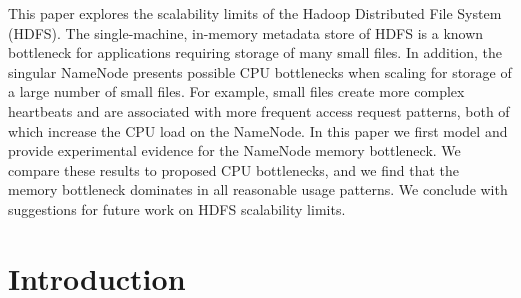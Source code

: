 \documentclass[11pt, a4paper]{article}
\author{\theauthor}
\title{\thetitle}
\date{\duedate}
\renewenvironment{abstract}
 {\small
  \begin{center}
  \bfseries \abstractname\vspace{-.5em}\vspace{0pt}
  \end{center}
  \list{}{%
    \setlength{\leftmargin}{0mm}%
    \setlength{\rightmargin}{\leftmargin}%
  }%
  \item\relax}
 {\endlist}
\begin{document}
\maketitle
\thispagestyle{empty}
\begin{multicols*}{2}
\begin{abstract}
    This paper explores the scalability limits of the Hadoop Distributed File System (HDFS). The single-machine, in-memory metadata store of HDFS is a known bottleneck for applications requiring storage of many small files. In addition, the singular NameNode presents possible CPU bottlenecks when scaling for storage of a large number of small files. For example, small files create more complex heartbeats and are associated with more frequent access request patterns, both of which increase the CPU load on the NameNode. In this paper we first model and provide experimental evidence for the NameNode memory bottleneck. We compare these results to proposed CPU bottlenecks, and we find that the memory bottleneck dominates in all reasonable usage patterns. We conclude with suggestions for future work on HDFS scalability limits.
\end{abstract}

\section{Introduction}




\end{multicols*}
\end{document}
